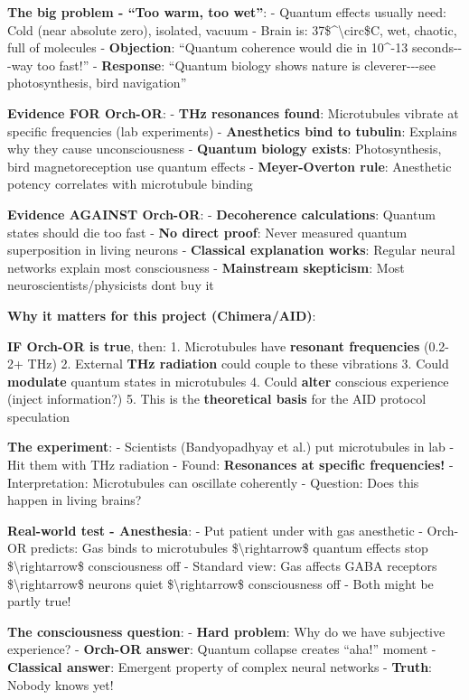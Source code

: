 \textbf{The big problem - ``Too warm, too wet''}: - Quantum effects
usually need: Cold (near absolute zero), isolated, vacuum - Brain is:
37\$\^{}\textbackslash circ\$C, wet, chaotic, full of molecules -
\textbf{Objection}: ``Quantum coherence would die in 10\^{}-13
seconds-\/-\/-way too fast!'' - \textbf{Response}: ``Quantum biology
shows nature is cleverer-\/-\/-see photosynthesis, bird navigation''

\textbf{Evidence FOR Orch-OR}: - \textbf{THz resonances found}:
Microtubules vibrate at specific frequencies (lab experiments) -
\textbf{Anesthetics bind to tubulin}: Explains why they cause
unconsciousness - \textbf{Quantum biology exists}: Photosynthesis, bird
magnetoreception use quantum effects - \textbf{Meyer-Overton rule}:
Anesthetic potency correlates with microtubule binding

\textbf{Evidence AGAINST Orch-OR}: - \textbf{Decoherence calculations}:
Quantum states should die too fast - \textbf{No direct proof}: Never
measured quantum superposition in living neurons - \textbf{Classical
explanation works}: Regular neural networks explain most consciousness -
\textbf{Mainstream skepticism}: Most neuroscientists/physicists
don\textquotesingle t buy it

\textbf{Why it matters for this project (Chimera/AID)}:

\textbf{IF Orch-OR is true}, then: 1. Microtubules have \textbf{resonant
frequencies} (0.2-2+ THz) 2. External \textbf{THz radiation} could
couple to these vibrations 3. Could \textbf{modulate} quantum states in
microtubules 4. Could \textbf{alter} conscious experience (inject
information?) 5. This is the \textbf{theoretical basis} for the AID
protocol speculation

\textbf{The experiment}: - Scientists (Bandyopadhyay et al.) put
microtubules in lab - Hit them with THz radiation - Found:
\textbf{Resonances at specific frequencies!} - Interpretation:
Microtubules can oscillate coherently - Question: Does this happen in
living brains?

\textbf{Real-world test - Anesthesia}: - Put patient under with gas
anesthetic - Orch-OR predicts: Gas binds to microtubules
\$\textbackslash rightarrow\$ quantum effects stop
\$\textbackslash rightarrow\$ consciousness off - Standard view: Gas
affects GABA receptors \$\textbackslash rightarrow\$ neurons quiet
\$\textbackslash rightarrow\$ consciousness off - Both might be partly
true!

\textbf{The consciousness question}: - \textbf{Hard problem}: Why do we
have subjective experience? - \textbf{Orch-OR answer}: Quantum collapse
creates ``aha!'' moment - \textbf{Classical answer}: Emergent property
of complex neural networks - \textbf{Truth}: Nobody knows yet!

